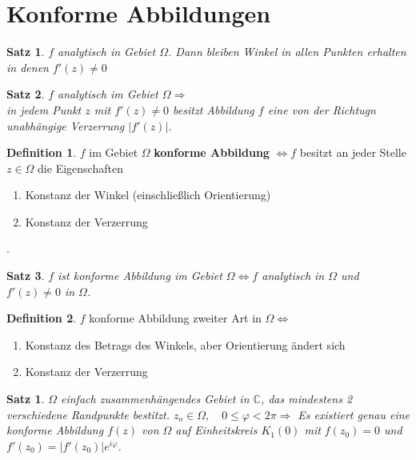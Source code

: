 \documentclass[ngerman,halfparskip]{scrartcl}
\newtheorem*{satz}{Satz}
\newtheorem*{satz*}{Satz}
\theoremstyle{definition}
\newtheorem*{defin}{Definition}
\def\C{\mathbb C}
\begin{document}
\section{Konforme Abbildungen}

\begin{satz}
$f$ analytisch in Gebiet $\Omega$. Dann bleiben Winkel in allen Punkten erhalten in denen $f'(z)\neq 0$ 
\end{satz}
\begin{satz}
$f$ analytisch im Gebiet $\Omega \Rightarrow $\\
in jedem Punkt $z$ mit $f'(z)\neq 0$ besitzt Abbildung $f$ eine von der Richtugn unabhängige Verzerrung $|f'(z)|$. 

\end{satz}

\begin{defin}
$f$ im Gebiet $\Omega$ \textbf{konforme Abbildung} $\Leftrightarrow f$ besitzt an jeder Stelle $z\in\Omega$ die Eigenschaften \begin{enumerate}
\item Konstanz der Winkel (einschließlich Orientierung)
\item Konstanz der Verzerrung
\end{enumerate}
. 
\end{defin}


\begin{satz}
$f$ ist konforme Abbildung im Gebiet $\Omega \Leftrightarrow f$ analytisch in $\Omega$ und $f'(z)\neq 0$ in $\Omega$.
\end{satz}

\begin{defin}
$f$ konforme Abbildung zweiter Art in $\Omega \Leftrightarrow$ 
\begin{enumerate}
\item Konstanz des Betrags des Winkels, aber Orientierung ändert sich
\item Konstanz der Verzerrung
\end{enumerate}
\end{defin}
\begin{satz*}
$\Omega$ einfach zusammenhängendes Gebiet in $\C$, das mindestens 2 verschiedene Randpunkte bestitzt. $z_o\in\Omega, \quad 0\leq \varphi <2\pi \Rightarrow $ Es existiert genau eine konforme Abbildung $f(z)$ von $\Omega$ auf Einheitskreis $K_1(0)$ mit $f(z_0)=0$ und $f'(z_0)=|f'(z_0)|e^{i\varphi}$. 
\end{satz*}
\end{document}

